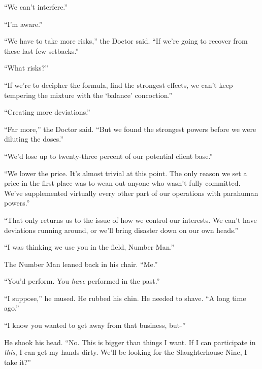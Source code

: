 ``We can't interfere.''



``I'm aware.''



``We have to take more risks,'' the Doctor said.  ``If we're going to recover from these last few setbacks.''



``What risks?''



``If we're to decipher the formula, find the strongest effects, we can't keep tempering the mixture with the `balance' concoction.''



``Creating more deviations.''



``Far more,'' the Doctor said.  ``But we found the strongest powers before we were diluting the doses.''



``We'd lose up to twenty-three percent of our potential client base.''



``We lower the price.  It's almost trivial at this point.  The only reason we set a price in the first place was to wean out anyone who wasn't fully committed.  We've supplemented virtually every other part of our operations with parahuman powers.''



``That only returns us to the issue of how we control our interests.  We can't have deviations running around, or we'll bring disaster down on our own heads.''



``I was thinking we use you in the field, Number Man.''



The Number Man leaned back in his chair.  ``Me.''



``You'd perform.  You \emph{have} performed in the past.''



``I suppose,'' he mused.  He rubbed his chin.  He needed to shave.  ``A long time ago.''



``I know you wanted to get away from that business, but-''



He shook his head.  ``No.  This is bigger than things I want.  If I can participate in \emph{this}, I can get my hands dirty.  We'll be looking for the Slaughterhouse Nine, I take it?''



